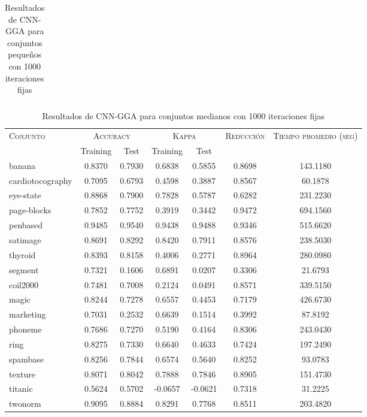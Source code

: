 \begin{table}[]
\begin{tabular}{l c c c c c c}
\hline
\end{tabular}
\caption{Resultados de CNN-GGA para conjuntos pequeños con 1000 iteraciones fijas}
\label{res-peq-cnn-gga}
\end{table}



\begin{table}[]
\centering
\begin{tabular}{l c c c c c c}
\hline
\multirow{2}{*}{\textsc{Conjunto}}
	& \multicolumn{2}{c}{\textsc{Accuracy}}
	& \multicolumn{2}{c}{\textsc{Kappa}}
	& \textsc{Reducción}
	& \textsc{Tiempo promedio (seg)} \\
	& Training & Test
	& Training & Test \\ 
\hline
\hline

banana & 0.8370 & 0.7930 & 0.6838 & 0.5855 & 0.8698 & 143.1180 \\
cardiotocography & 0.7095 & 0.6793 & 0.4598 & 0.3887 & 0.8567 & 60.1878 \\
eye-state & 0.8868 & 0.7900 & 0.7828 & 0.5787 & 0.6282 & 231.2230 \\
page-blocks & 0.7852 & 0.7752 & 0.3919 & 0.3442 & 0.9472 & 694.1560 \\
penbased & 0.9485 & 0.9540 & 0.9438 & 0.9488 & 0.9346 & 515.6620 \\
satimage & 0.8691 & 0.8292 & 0.8420 & 0.7911 & 0.8576 & 238.5030 \\
thyroid & 0.8393 & 0.8158 & 0.4006 & 0.2771 & 0.8964 & 280.0980 \\
segment & 0.7321 & 0.1606 & 0.6891 & 0.0207 & 0.3306 & 21.6793 \\
coil2000 & 0.7481 & 0.7008 & 0.2124 & 0.0491 & 0.8571 & 339.5150 \\
magic & 0.8244 & 0.7278 & 0.6557 & 0.4453 & 0.7179 & 426.6730 \\
marketing & 0.7031 & 0.2532 & 0.6639 & 0.1514 & 0.3992 & 87.8192 \\
phoneme & 0.7686 & 0.7270 & 0.5190 & 0.4164 & 0.8306 & 243.0430 \\
ring & 0.8275 & 0.7330 & 0.6640 & 0.4633 & 0.7424 & 197.2490 \\
spambase & 0.8256 & 0.7844 & 0.6574 & 0.5640 & 0.8252 & 93.0783 \\
texture & 0.8071 & 0.8042 & 0.7888 & 0.7846 & 0.8905 & 151.4730 \\
titanic & 0.5624 & 0.5702 & -0.0657 & -0.0621 & 0.7318 & 31.2225 \\
twonorm & 0.9095 & 0.8884 & 0.8291 & 0.7768 & 0.8511 & 203.4820 \\

\hline
\end{tabular}
\caption{Resultados de CNN-GGA para conjuntos medianos con 1000 iteraciones fijas}
\label{res-med-cnn-gga}
\end{table}



